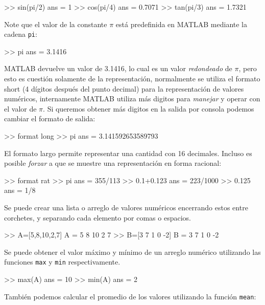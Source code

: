 \begin{matlab}
>> sin(pi/2)
ans =
     1
>> cos(pi/4)
ans =
    0.7071
>> tan(pi/3)
ans =
    1.7321
\end{matlab}

Note que el valor de la constante $\pi$ está predefinida en
MATLAB mediante la cadena \texttt{pi}:

\begin{matlab}
>> pi
ans =
    3.1416
\end{matlab}

MATLAB devuelve un valor de 3.1416, lo cual es un valor
\emph{redondeado} de $\pi$, pero esto es cuestión solamente de
la representación, normalmente se utiliza el formato short (4 dígitos
después del punto decimal) para la representación de valores numéricos,
internamente MATLAB utiliza más digitos para \emph{manejar} y operar con
el valor de $\pi$. Si queremos obtener más digitos en la salida
por consola podemos cambiar el formato de salida:

\begin{matlab}
>> format long
>> pi
ans =
   3.141592653589793
\end{matlab}

El formato largo permite representar una cantidad con 16 decimales.
Incluso es posible \emph{forzar} a que se muestre una representación en
forma racional:

\begin{matlab}
>> format rat
>> pi
ans =
     355/113   
>> 0.1+0.123
ans =
     223/1000  
>> 0.125
ans =
       1/8
\end{matlab}

Se puede crear una lista o arreglo de valores numéricos encerrando estos
entre corchetes, y separando cada elemento por comas o espacios.

\begin{matlab}
>> A=[5,8,10,2,7]
A =
     5     8    10     2     7
>> B=[3 7 1 0 -2]
B =
     3     7     1     0    -2
\end{matlab}

Se puede obtener el valor máximo y mínimo de un arreglo numérico
utilizando las funciones \texttt{max} y \texttt{min} respectivamente.

\begin{matlab}
>> max(A)
ans =
    10
>> min(A)
ans =
     2
\end{matlab}

También podemos calcular el promedio de los valores utilizando la
función \texttt{mean}:

